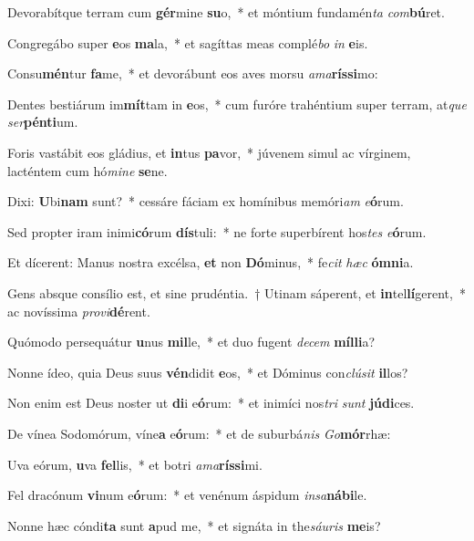 \item Devorabítque terram cum \textbf{gér}mine \textbf{su}o,~* et móntium fundamén\textit{ta} \textit{com}\textbf{bú}ret.
\item Congregábo super \textbf{e}os \textbf{ma}la,~* et sagíttas meas complé\textit{bo} \textit{in} \textbf{e}is.
\item Consu\textbf{mén}tur \textbf{fa}me,~* et devorábunt eos aves morsu \textit{a}\textit{ma}\textbf{rís}\textbf{si}mo:
\item Dentes bestiárum im\textbf{mít}tam in \textbf{e}os,~* cum furóre trahéntium super terram, at\textit{que} \textit{ser}\textbf{pén}\textbf{ti}um.
\item Foris vastábit eos gládius, et \textbf{in}tus \textbf{pa}vor,~* júvenem simul ac vírginem, lacténtem cum hó\textit{mi}\textit{ne} \textbf{se}ne.
\item Dixi: \textbf{U}bi\textbf{nam} sunt?~* cessáre fáciam ex homínibus memóri\textit{am} \textit{e}\textbf{ó}rum.
\item Sed propter iram inimi\textbf{có}rum \textbf{dís}tuli:~* ne forte superbírent hos\textit{tes} \textit{e}\textbf{ó}rum.
\item Et dícerent: Manus nostra excélsa, \textbf{et} non \textbf{Dó}minus,~* fe\textit{cit} \textit{hæc} \textbf{óm}\textbf{ni}a.
\item Gens absque consílio est, et sine prudéntia.~† Utinam sáperent, et \textbf{in}tel\textbf{lí}gerent,~* ac novíssima \textit{pro}\textit{vi}\textbf{dé}rent.
\item Quómodo persequátur \textbf{u}nus \textbf{mil}le,~* et duo fugent \textit{de}\textit{cem} \textbf{míl}\textbf{li}a?
\item Nonne ídeo, quia Deus suus \textbf{vén}didit \textbf{e}os,~* et Dóminus con\textit{clú}\textit{sit} \textbf{il}los?
\item Non enim est Deus noster ut \textbf{di}i e\textbf{ó}rum:~* et inimíci nos\textit{tri} \textit{sunt} \textbf{jú}\textbf{di}ces.
\item De vínea Sodomórum, víne\textbf{a} e\textbf{ó}rum:~* et de suburbá\textit{nis} \textit{Go}\textbf{mór}rhæ:
\item Uva eórum, \textbf{u}va \textbf{fel}lis,~* et botri \textit{a}\textit{ma}\textbf{rís}\textbf{si}mi.
\item Fel dracónum \textbf{vi}num e\textbf{ó}rum:~* et venénum áspidum \textit{in}\textit{sa}\textbf{ná}\textbf{bi}le.
\item Nonne hæc cóndi\textbf{ta} sunt \textbf{a}pud me,~* et signáta in the\textit{sáu}\textit{ris} \textbf{me}is?
